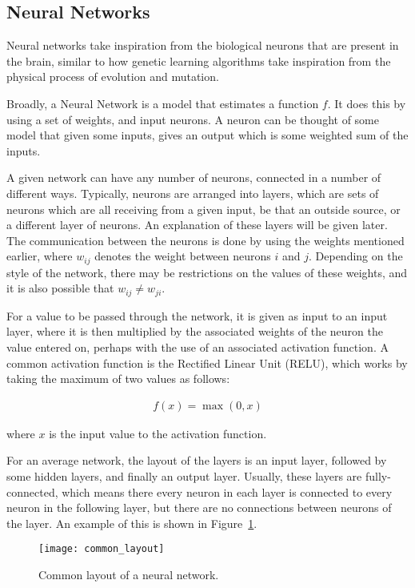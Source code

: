 \subsection{Neural Networks}

Neural networks take inspiration from the biological neurons that
are present in the brain, similar to how genetic learning
algorithms take inspiration from the physical process of evolution
and mutation\cite{goldberg2006genetic}.

Broadly, a Neural Network is a model that estimates a function $f$.
It does this by using a set of weights, and input neurons. A neuron
can be thought of some model that given some inputs, gives
an output which is some weighted sum of the inputs.

A given network can have any number of neurons, connected in a number of
different ways. Typically, neurons are arranged into layers, which are sets of
neurons which are all receiving from a given input, be that an outside source,
or a different layer of neurons. An explanation of these layers will be given
later. The communication between the neurons is done by using the weights
mentioned earlier, where $w_{ij}$ denotes the weight between neurons $i$ and
$j$. Depending on the style of the network, there may be restrictions on the
values of these weights, and it is also possible that $w_{ij} \ne w_{ji}$.

For a value to be passed through the network, it is given as input to an input
layer, where it is then multiplied by the associated weights of the neuron the
value entered on, perhaps with the use of an associated activation function. A
common activation function is the Rectified Linear Unit
(RELU)\cite{Nair:2010:RLU:3104322.3104425}, which works by taking the maximum of
two values as follows:

\begin{align}
    f(x) = \max(0, x)
\end{align}

where $x$ is the input value to the activation function.

For an average network, the layout of the layers is an input layer,
followed by some hidden layers, and finally an output layer. Usually,
these layers are fully-connected, which means there every neuron in each
layer is connected to every neuron in the following layer, but
there are no connections between neurons of the layer. An example of this
is shown in Figure~\ref{fig:common_layout}.

\begin{figure}
    \centering
    \texttt{[image: common\_layout]}
    \caption{Common layout of a neural network.}%
    \label{fig:common_layout}
\end{figure}

